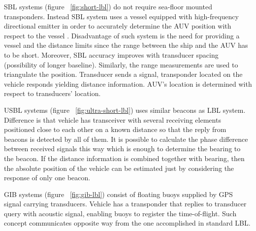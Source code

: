 SBL systems (figure ~\ref{fig:short-lbl}) do not require sea-floor mounted transponders. Instead SBL system uses a vessel equipped with high-frequency directional emitter in order to accurately determine the AUV position with respect to the vessel \cite{maurelli08}. Disadvantage of such system is the need for providing a vessel and the distance limits since the range between the ship and the AUV has to be short. Moreover, SBL accuracy improves with transducer spacing (possibility of longer baseline). Similarly, the range measurements are used to triangulate the position. Transducer sends a signal, transponder located on the vehicle responds yielding distance information. AUV's location is determined with respect to transducers' location.

USBL systems (figure ~\ref{fig:ultra-short-lbl}) uses similar beacons as LBL system. Difference is that vehicle has transceiver with several receiving elements positioned close to each other on a known distance so that the reply from beacons is detected by all of them. It is possible to calculate the phase difference between received signals this way which is enough to determine the bearing to the beacon. If the distance information is combined together with bearing, then the absolute position of the vehicle can be estimated just by considering the response of only one beacon. 

GIB systems (figure ~\ref{fig:gib-lbl}) consist of floating buoys supplied by GPS signal carrying transducers. Vehicle has a transponder that replies to transducer query with acoustic signal, enabling buoys to register the time-of-flight. Such concept communicates opposite way from the one accomplished in standard LBL.    

